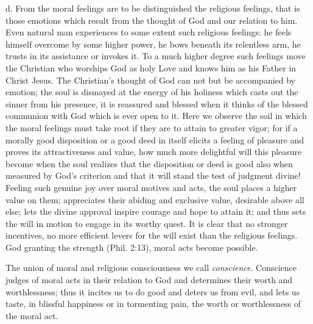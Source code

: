 d. From the moral feelings are to be distinguished the religious feelings, that is those emotions which result from the thought of God and our relation to him. Even natural man experiences to some extent such religious feelings: he feels himself overcome by some higher power, he bows beneath
its relentless arm, he trusts in its assistance or invokes it. To a much higher degree such feelings move the Christian who worships God as holy Love and knows him as his Father in Christ Jesus. The Christian’s thought of God can not but be accompanied by emotion; the soul is dismayed at the energy of his holiness which casts out the sinner from his presence, it is reassured and blessed when it thinks of the blessed communion with God which is ever open to it. Here we observe the soil in which the moral feelings must take root if they are to attain to greater vigor; for if a morally good disposition or a good deed in itself elicits a feeling of pleasure and proves its attractiveness and value, how much more delightful will this pleasure become when the soul realizes that the disposition or deed is good also when measured by God’s criterion and that it will stand the test of judgment divine! Feeling such genuine joy over moral motives and acts, the soul places a higher value on them; appreciates their abiding and exclusive value, desirable above all else; lets the divine approval inspire courage and hope to attain it; and thus sets the will in motion to engage in its worthy quest. It is clear that no stronger incentives, no more efficient levers for the will exist than the religious feelings. God granting the strength (Phil. 2:13), moral acts become possible.

The union of moral and religious consciousness we call \emph{conscience}. Conscience judges of moral acts in their relation to God and determines their worth and worthlessness; thus it incites us to do good and deters us from evil, and lets us taste, in blissful happiness or in tormenting pain, the worth or worthlessness of the moral act.

